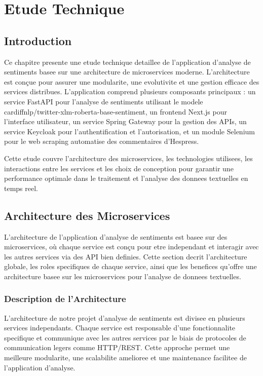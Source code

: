 \chapter{Etude Technique}

\section{Introduction}

Ce chapitre presente une etude technique detaillee de l'application d'analyse de sentiments basee sur une architecture de microservices moderne. L'architecture est conçue pour assurer une modularite, une evolutivite et une gestion efficace des services distribues. L'application comprend plusieurs composants principaux : un service FastAPI pour l'analyse de sentiments utilisant le modele cardiffnlp/twitter-xlm-roberta-base-sentiment, un frontend Next.js pour l'interface utilisateur, un service Spring Gateway pour la gestion des APIs, un service Keycloak pour l'authentification et l'autorisation, et un module Selenium pour le web scraping automatise des commentaires d'Hespress.

Cette etude couvre l'architecture des microservices, les technologies utilisees, les interactions entre les services et les choix de conception pour garantir une performance optimale dans le traitement et l'analyse des donnees textuelles en temps reel.

\section{Architecture des Microservices}

L'architecture de l'application d'analyse de sentiments est basee sur des microservices, où chaque service est conçu pour etre independant et interagir avec les autres services via des API bien definies. Cette section decrit l'architecture globale, les roles specifiques de chaque service, ainsi que les benefices qu'offre une architecture basee sur les microservices pour l'analyse de donnees textuelles.

\subsection{Description de l'Architecture}

L'architecture de notre projet d'analyse de sentiments est divisee en plusieurs services independants. Chaque service est responsable d'une fonctionnalite specifique et communique avec les autres services par le biais de protocoles de communication legers comme HTTP/REST. Cette approche permet une meilleure modularite, une scalabilite amelioree et une maintenance facilitee de l'application d'analyse.

